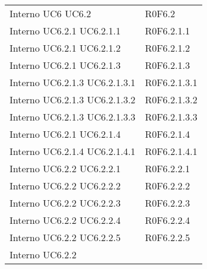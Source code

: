 \begin{longtable}{p{2.5cm}!{\VRule[1pt]}p{2.5cm}}
Interno \newline UC6
 \newline UC6.2
 & R0F6.2 \\
Interno \newline UC6.2.1
 \newline UC6.2.1.1
 & R0F6.2.1.1 \\
Interno \newline UC6.2.1
 \newline UC6.2.1.2
 & R0F6.2.1.2 \\
Interno \newline UC6.2.1
 \newline UC6.2.1.3
 & R0F6.2.1.3 \\
Interno \newline UC6.2.1.3
 \newline UC6.2.1.3.1
 & R0F6.2.1.3.1 \\
Interno \newline UC6.2.1.3
 \newline UC6.2.1.3.2
 & R0F6.2.1.3.2 \\
Interno \newline UC6.2.1.3
 \newline UC6.2.1.3.3
 & R0F6.2.1.3.3 \\
Interno \newline UC6.2.1
 \newline UC6.2.1.4
 & R0F6.2.1.4 \\
Interno \newline UC6.2.1.4
 \newline UC6.2.1.4.1
 & R0F6.2.1.4.1 \\
Interno \newline UC6.2.2
 \newline UC6.2.2.1
 & R0F6.2.2.1 \\
Interno \newline UC6.2.2
 \newline UC6.2.2.2
 & R0F6.2.2.2 \\
Interno \newline UC6.2.2
 \newline UC6.2.2.3
 & R0F6.2.2.3 \\
Interno \newline UC6.2.2
 \newline UC6.2.2.4
 & R0F6.2.2.4 \\
Interno \newline UC6.2.2
 \newline UC6.2.2.5
 & R0F6.2.2.5 \\
Interno \newline UC6.2.2

\end{longtable}
